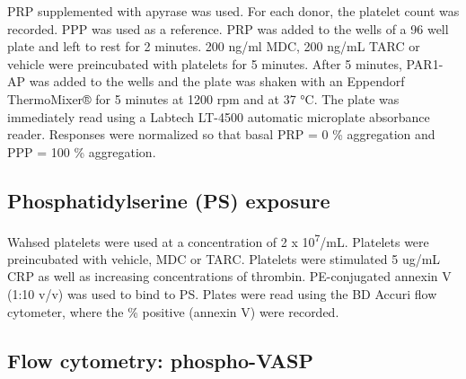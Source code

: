 \documentclass[11pt,twoside]{bristolthesis}
\begin{document}
PRP supplemented with apyrase was used. For each donor, the platelet count was recorded. PPP was used as a reference. PRP was added to the wells of a 96 well plate and left to rest for 2 minutes. 200 ng/ml MDC, 200 ng/mL TARC or vehicle were preincubated with platelets for 5 minutes. After 5 minutes, PAR1-AP was added to the wells and the plate was shaken with an Eppendorf ThermoMixer® for 5 minutes at 1200 rpm and at 37 °C. The plate was immediately read using a Labtech LT-4500 automatic microplate absorbance reader. Responses were normalized so that basal PRP = 0 \% aggregation and PPP = 100 \% aggregation.

\hypertarget{phosphatidylserine-ps-exposure}{%
\subsection{Phosphatidylserine (PS) exposure}\label{phosphatidylserine-ps-exposure}}

Wahsed platelets were used at a concentration of 2 x 10\textsuperscript{7}/mL. Platelets were preincubated with vehicle, MDC or TARC. Platelets were stimulated 5 ug/mL CRP as well as increasing concentrations of thrombin. PE-conjugated annexin V (1:10 v/v) was used to bind to PS. Plates were read using the BD Accuri flow cytometer, where the \% positive (annexin V) were recorded.

\hypertarget{flow-cytometry-phospho-vasp}{%
\subsection{Flow cytometry: phospho-VASP}\label{flow-cytometry-phospho-vasp}}
\end{document}
